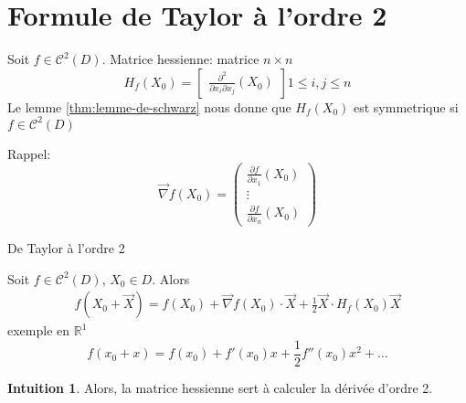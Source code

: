 \documentclass[a4paper]{report}
\newcommand\R{\ensuremath{\mathbb{R}}}
\theoremstyle{definition}
\newtheorem*{intuition}{Intuition}
\begin{document}
\section{Formule de Taylor à l'ordre 2}
\begin{definition}
    Soit $f \in \mathcal{C}^2(D)$. Matrice hessienne: matrice  $n \times n$
    \[
    H_f(X_0) = \begin{bmatrix} \frac{\partial^2}{\partial x_i \partial x_j}(X_0) \end{bmatrix} 1\le i,j \le n
    \] 
    Le lemme \ref{thm:lemme-de-schwarz} nous donne que $H_f(X_0)$ est symmetrique si $f \in \mathcal{C}^2(D)$
\end{definition}
Rappel: 
\[
    \vec{\nabla}f(X_0) = \begin{pmatrix} \frac{\partial f}{\partial x_1}(X_0) \\ \vdots \\ \frac{\partial f}{\partial x_n}(X_0) \end{pmatrix} 
\] 

\begin{theorem} De Taylor à l'ordre 2 \par
    Soit $f \in \mathcal{C}^2(D)$,  $X_0 \in D$. Alors  
    \begin{align*}
        f(X_0 + \vec{X}) = f(X_0) + \vec{\nabla }f(X_0) \cdot \vec{X} + \frac{1}{2}\vec{X} \cdot H_f(X_0)\vec{X}
    \end{align*}
    exemple en $\R^1$
    \[
    f(x_0 + x) = f(x_0) + f'(x_0)x + \frac{1}{2}f''(x_0)x^2 + \ldots
    \] 
\end{theorem}
\begin{intuition}
   Alors, la matrice hessienne sert à calculer la dérivée d'ordre 2. 
\end{intuition}
\end{document}
